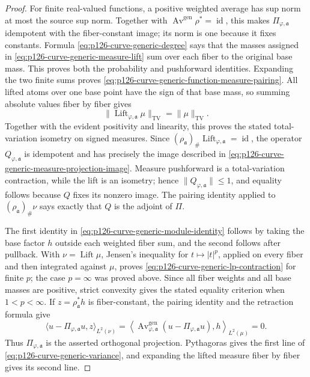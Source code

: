 \begin{proof}
For finite real-valued functions, a positive weighted average has sup norm
at most the source sup norm.  Together with
\(\operatorname{Av}^{\mathrm{gen}}\rho^*=\operatorname{id}\), this makes
\(\Pi_{\varphi,\mathfrak a}\) idempotent with the fiber-constant image; its
norm is one because it fixes constants.  Formula
\eqref{eq:p126-curve-generic-degree} says that the masses assigned in
\eqref{eq:p126-curve-generic-measure-lift} sum over each fiber to the original
base mass.  This proves both the probability and pushforward identities.
Expanding the two finite sums proves
\eqref{eq:p126-curve-generic-function-measure-pairing}.
All lifted atoms over one base point have the sign of that base mass, so
summing absolute values fiber by fiber gives
\[
 \|\operatorname{Lift}_{\varphi,\mathfrak a}\mu\|_{\mathrm{TV}}
   =\|\mu\|_{\mathrm{TV}}.
\]
Together with the evident positivity and linearity, this proves the stated
total-variation isometry on signed measures.  Since
\((\rho_{\mathfrak a})_\#\operatorname{Lift}_{\varphi,\mathfrak a}
=\operatorname{id}\), the operator \(Q_{\varphi,\mathfrak a}\) is
idempotent and has precisely the image described in
\eqref{eq:p126-curve-generic-measure-projection-image}.  Measure pushforward
is a total-variation contraction, while the lift is an isometry; hence
\(\|Q_{\varphi,\mathfrak a}\|\leq1\), and equality follows because \(Q\)
fixes its nonzero image.  The pairing identity applied to
\((\rho_{\mathfrak a})_\#\nu\) says exactly that \(Q\) is the adjoint of
\(\Pi\).

The first identity in
\eqref{eq:p126-curve-generic-module-identity} follows by taking the base
factor \(h\) outside each weighted fiber sum, and the second follows after
pullback.  With \(\nu=\operatorname{Lift}\mu\), Jensen's inequality for
\(t\mapsto |t|^p\), applied on every fiber and then integrated against
\(\mu\), proves \eqref{eq:p126-curve-generic-lp-contraction} for finite
\(p\); the case \(p=\infty\) was proved above.  Since all fiber weights and
all base masses are positive, strict convexity gives the stated equality
criterion when \(1<p<\infty\).  If \(z=\rho_{\mathfrak a}^*h\) is
fiber-constant, the pairing identity and the retraction formula give
\[
 \langle u-\Pi_{\varphi,\mathfrak a}u,z\rangle_{L^2(\nu)}
 =\left\langle
    \operatorname{Av}^{\mathrm{gen}}_{\varphi,\mathfrak a}
       (u-\Pi_{\varphi,\mathfrak a}u),h
  \right\rangle_{L^2(\mu)}=0.
\]
Thus \(\Pi_{\varphi,\mathfrak a}\) is the asserted orthogonal projection.
Pythagoras gives the first line of
\eqref{eq:p126-curve-generic-variance}, and expanding the lifted measure
fiber by fiber gives its second line.


\end{proof}
